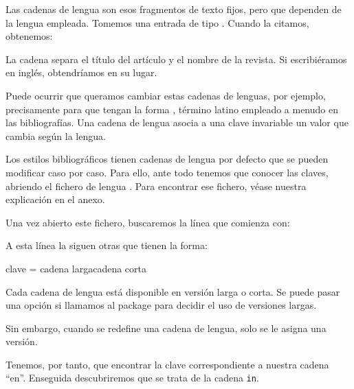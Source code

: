     Las cadenas de lengua son esos fragmentos de texto fijos, pero que dependen de la lengua empleada. Tomemos una entrada de tipo . Cuando la citamos, obtenemos:
    
     
     
    \begin{quotation}
        \cite{Junod1992}
    \end{quotation}
    
    La cadena  separa el título del artículo y el nombre de la revista. Si escribiéramos en inglés, obtendríamos  en su lugar.  
    
    
   Puede ocurrir que queramos cambiar estas cadenas de lenguas, por ejemplo, precisamente para que tengan la forma , término latino empleado a menudo en las bibliografías. Una cadena de lengua asocia a una clave invariable un valor que cambia según la lengua.

    
    Los estilos bibliográficos tienen cadenas de lengua por defecto que se pueden modificar caso por caso. Para ello, ante todo tenemos que conocer las claves, abriendo el fichero de lengua . Para encontrar ese fichero, véase nuestra explicación en el anexo.
    
    Una vez abierto este fichero, buscaremos la línea que comienza con:
    

    
    A esta línea la siguen otras que tienen la forma:
    
    \begin{latexcode}
clave    = {{cadena larga}{cadena corta}}
    \end{latexcode}

    
    \begin{plusloins}
    Cada cadena de lengua está disponible en versión larga o corta. Se puede pasar una opción si llamamos al package  para decidir el uso de versiones largas.
    
    \begin{latexcode}
\usepackage[abbreviate=false]{biblatex}
    \end{latexcode}

    
    Sin embargo, cuando se redefine una cadena de lengua, solo se le asigna una versión.

    
    \end{plusloins}
    
    Tenemos, por tanto, que encontrar la clave correspondiente a nuestra cadena \enquote{en}. Enseguida descubriremos que se trata de la cadena \verb|in|.
    
